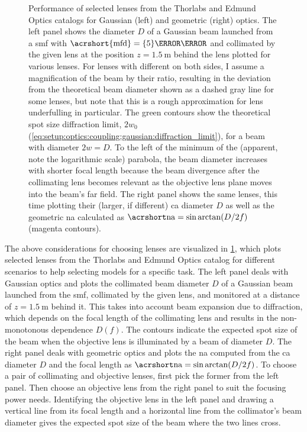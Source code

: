 \begin{figure}
    \centering
    \caption[]{
        Performance of selected lenses from the Thorlabs and Edmund Optics catalogs for Gaussian (left) and geometric (right) optics.
        The left panel shows the diameter $D$ of a Gaussian beam launched from a \gls{smf} with $\mr{\acrshort{mfd}} = \qty{5}{\micro\meter}$ and collimated by the given lens at the position $z = \qty{1.5}{\meter}$ behind the lens plotted for various lenses.
        For lenses with different  on both sides, I assume a magnification of the beam by their ratio, resulting in the deviation from the theoretical beam diameter shown as a dashed gray line for some lenses, but note that this is a rough approximation for lens underfulling in particular.
        The green contours show the theoretical spot size diffraction limit, $2w_0$ (\cref{eq:setup:optics:coupling:gaussian:diffraction_limit}), for a beam with diameter $2w=D$.
        To the left of the minimum of the (apparent, note the logarithmic scale) parabola, the beam diameter increases with shorter focal length because the beam divergence after the collimating lens becomes relevant as the objective lens plane moves into the beam's far field.
        The right panel shows the same lenses, this time plotting their (larger, if different) \gls{ca} diameter $D$ as well as the geometric \gls{na} calculated as $\NA = \sin\arctan(D/2f)$ (magenta contours).
    }
    \label{fig:setup:optics:coupling:lenses}
\end{figure}

The above considerations for choosing lenses are visualized in \cref{fig:setup:optics:coupling:lenses}, which plots selected lenses from the Thorlabs and Edmund Optics catalog for different scenarios to help selecting models for a specific task.
The left panel deals with Gaussian optics and plots the collimated beam diameter $D$ of a Gaussian beam launched from the \gls{smf}, collimated by the given lens, and monitored at a distance of $z=\qty{1.5}{\meter}$ behind it.
This takes into account beam expansion due to diffraction, which depends on the focal length of the collimating lens and results in the non-monotonous dependence $D(f)$.
The contours indicate the expected spot size of the beam when the objective lens is illuminated by a beam of diameter $D$.
The right panel deals with geometric optics and plots the \gls{na} computed from the \gls{ca} diameter $D$ and the focal length as $\NA = \sin\arctan(D/2f)$.
To choose a pair of collimating and objective lenses, first pick the former from the left panel.
Then choose an objective lens from the right panel to suit the focusing power needs.
Identifying the objective lens in the left panel and drawing a vertical line from its focal length and a horizontal line from the collimator's beam diameter gives the expected spot size of the beam where the two lines cross.

